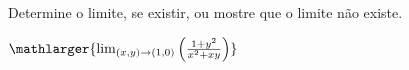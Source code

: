 Determine o limite, se existir, ou mostre que o limite não existe.

\item$\mathlarger{\lim_{(x,y)\rightarrow(1,0)}  \left( \frac{1+y^2}{x^2+xy} \right)}$


